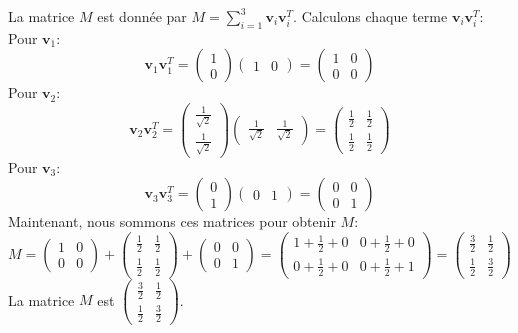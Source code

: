 \documentclass[11pt,a4paper]{report}
\begin{document}
La matrice \(M\) est donnée par
\(M = \sum_{i=1}^3 \mathbf{v}_i \mathbf{v}_i^T\). Calculons chaque terme
\(\mathbf{v}_i \mathbf{v}_i^T\): Pour \(\mathbf{v}_1\):
\[ \mathbf{v}_1 \mathbf{v}_1^T = \begin{pmatrix} 1 \\ 0 \end{pmatrix} \begin{pmatrix} 1 & 0 \end{pmatrix} = \begin{pmatrix} 1 & 0 \\ 0 & 0 \end{pmatrix} \]
Pour \(\mathbf{v}_2\):
\[ \mathbf{v}_2 \mathbf{v}_2^T = \begin{pmatrix} \frac{1}{\sqrt{2}} \\ \frac{1}{\sqrt{2}} \end{pmatrix} \begin{pmatrix} \frac{1}{\sqrt{2}} & \frac{1}{\sqrt{2}} \end{pmatrix} = \begin{pmatrix} \frac{1}{2} & \frac{1}{2} \\ \frac{1}{2} & \frac{1}{2} \end{pmatrix} \]
Pour \(\mathbf{v}_3\):
\[ \mathbf{v}_3 \mathbf{v}_3^T = \begin{pmatrix} 0 \\ 1 \end{pmatrix} \begin{pmatrix} 0 & 1 \end{pmatrix} = \begin{pmatrix} 0 & 0 \\ 0 & 1 \end{pmatrix} \]
Maintenant, nous sommons ces matrices pour obtenir \(M\):
\[ M = \begin{pmatrix} 1 & 0 \\ 0 & 0 \end{pmatrix} + \begin{pmatrix} \frac{1}{2} & \frac{1}{2} \\ \frac{1}{2} & \frac{1}{2} \end{pmatrix} + \begin{pmatrix} 0 & 0 \\ 0 & 1 \end{pmatrix} = \begin{pmatrix} 1 + \frac{1}{2} + 0 & 0 + \frac{1}{2} + 0 \\ 0 + \frac{1}{2} + 0 & 0 + \frac{1}{2} + 1 \end{pmatrix} = \begin{pmatrix} \frac{3}{2} & \frac{1}{2} \\ \frac{1}{2} & \frac{3}{2} \end{pmatrix} \]
La matrice \(M\) est
\(\begin{pmatrix} \frac{3}{2} & \frac{1}{2} \\ \frac{1}{2} & \frac{3}{2} \end{pmatrix}\).
\end{document}
